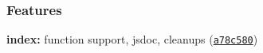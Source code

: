 \subsubsection*{Features}


\begin{DoxyItemize}
\item {\bfseries index\+:} function support, jsdoc, cleanups (\href{https://github.com/michael-ciniawsky/postcss-load-config/commit/a78c580}{\tt a78c580}) 
\end{DoxyItemize}
